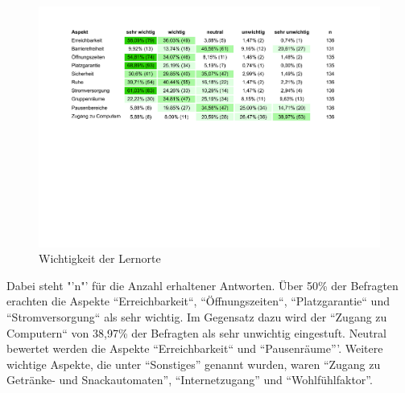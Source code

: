 \documentclass[11pt, a4paper]{article}
\begin{document}
\begin{figure}[htbp]
	\vspace*{6.2cm}
	\hspace*{-1.95cm}
	\includegraphics[scale = 0.746, trim=0.5cm 11cm 0.5cm 11cm]{Tabellen.pdf}
		\vspace{-0.34cm}
	\caption{Wichtigkeit der Lernorte}
	\vspace{0.28cm}
\end{figure}
   Dabei steht "'n"' für die Anzahl erhaltener Antworten. Über 50\% der Befragten erachten die Aspekte “Erreichbarkeit“, “Öffnungszeiten“, “Platzgarantie“ und “Stromversorgung“ als sehr wichtig. Im Gegensatz dazu wird der “Zugang zu Computern“ von 38,97\% der Befragten als sehr unwichtig eingestuft. Neutral bewertet werden die Aspekte “Erreichbarkeit“ und “Pausenräume”'. Weitere wichtige Aspekte, die unter “Sonstiges” genannt wurden, waren “Zugang zu Getränke- und Snackautomaten”, “Internetzugang” und “Wohlfühlfaktor”.
\end{document}
